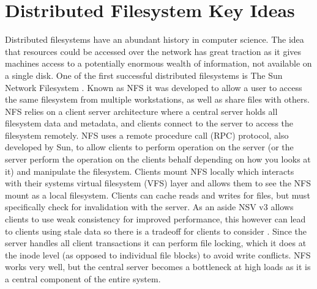 \section{Distributed Filesystem Key Ideas}

Distributed filesystems have an abundant history in computer science. The idea
that resources could be accessed over the network has great traction as it
gives machines access to a potentially enormous wealth of information, not
available on a single disk. One of the first successful distributed
filesystems is The Sun Network Filesystem \cite{Sandberg1985}. Known as NFS it
was developed to allow a user to access the same filesystem from multiple
workstations, as well as share files with others. NFS relies on a client
server architecture where a central server holds all filesystem data and
metadata, and clients connect to the server to access the filesystem remotely.
NFS uses a remote procedure call (RPC) protocol, also developed by Sun, to
allow clients to perform operation on the server (or the server perform the
operation on the clients behalf depending on how you looks at it) and
manipulate the filesystem. Clients mount NFS locally which interacts with
their systems virtual filesystem (VFS) layer and allows them to see the NFS
mount as a local filesystem. Clients can cache reads and writes for files, but
must specifically check for invalidation with the server. As an aside NSV v3
allows clients to use weak consistency for improved performance, this however
can lead to clients using stale data so there is a tradeoff for clients to
consider \cite{Pawlowski1994}. Since the server handles all client
transactions it can perform file locking, which it does at the inode level (as
opposed to individual file blocks) to avoid write conflicts. NFS works very
well, but the central server becomes a bottleneck at high loads as it is a
central component of the entire system.

